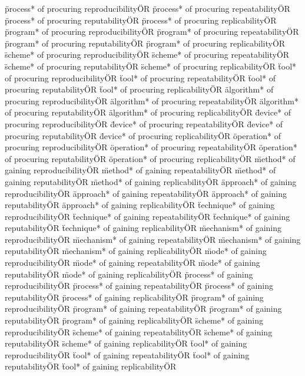 \documentclass[
10pt, %
a4paper, %
oneside, %
headinclude,footinclude, %
BCOR5mm, %
]{scrartcl}
\begin{document}
\"process* of procuring reproducibility\" OR \"process* of procuring repeatability\" OR \"process* of procuring reputability\" OR \"process* of procuring replicability\" OR 
\"program* of procuring reproducibility\" OR \"program* of procuring repeatability\" OR \"program* of procuring reputability\" OR \"program* of procuring replicability\" OR 
\"scheme* of procuring reproducibility\" OR \"scheme* of procuring repeatability\" OR \"scheme* of procuring reputability\" OR \"scheme* of procuring replicability\" OR 
\"tool* of procuring reproducibility\" OR \"tool* of procuring repeatability\" OR \"tool* of procuring reputability\" OR \"tool* of procuring replicability\" OR 
\"algorithm* of procuring reproducibility\" OR \"algorithm* of procuring repeatability\" OR \"algorithm* of procuring reputability\" OR \"algorithm* of procuring replicability\" OR 
\"device* of procuring reproducibility\" OR \"device* of procuring repeatability\" OR \"device* of procuring reputability\" OR \"device* of procuring replicability\" OR 
\"operation* of procuring reproducibility\" OR \"operation* of procuring repeatability\" OR \"operation* of procuring reputability\" OR \"operation* of procuring replicability\" OR 
\"method* of gaining reproducibility\" OR \"method* of gaining repeatability\" OR \"method* of gaining reputability\" OR \"method* of gaining replicability\" OR 
\"approach* of gaining reproducibility\" OR \"approach* of gaining repeatability\" OR \"approach* of gaining reputability\" OR \"approach* of gaining replicability\" OR 
\"technique* of gaining reproducibility\" OR \"technique* of gaining repeatability\" OR \"technique* of gaining reputability\" OR \"technique* of gaining replicability\" OR 
\"mechanism* of gaining reproducibility\" OR \"mechanism* of gaining repeatability\" OR \"mechanism* of gaining reputability\" OR \"mechanism* of gaining replicability\" OR 
\"mode* of gaining reproducibility\" OR \"mode* of gaining repeatability\" OR \"mode* of gaining reputability\" OR \"mode* of gaining replicability\" OR 
\"process* of gaining reproducibility\" OR \"process* of gaining repeatability\" OR \"process* of gaining reputability\" OR \"process* of gaining replicability\" OR 
\"program* of gaining reproducibility\" OR \"program* of gaining repeatability\" OR \"program* of gaining reputability\" OR \"program* of gaining replicability\" OR 
\"scheme* of gaining reproducibility\" OR \"scheme* of gaining repeatability\" OR \"scheme* of gaining reputability\" OR \"scheme* of gaining replicability\" OR 
\"tool* of gaining reproducibility\" OR \"tool* of gaining repeatability\" OR \"tool* of gaining reputability\" OR \"tool* of gaining replicability\" OR 
\end{document}
